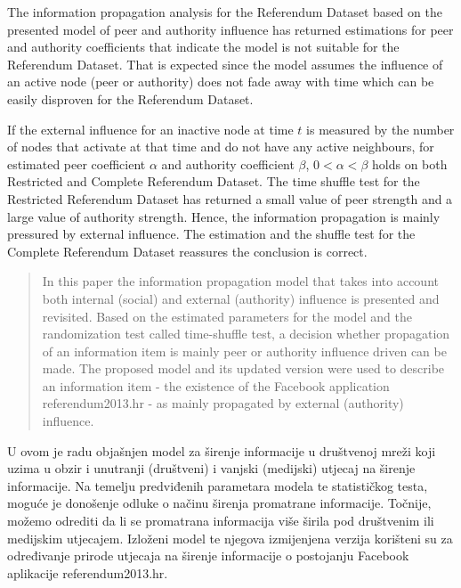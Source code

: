 \documentclass[times, utf8, zavrsni]{fer}
\begin{document}
The information propagation analysis for the Referendum Dataset based on the presented model of peer and authority influence has returned estimations for peer and authority coefficients that indicate the model is not suitable for the Referendum Dataset. That is expected since the model assumes the influence of an active node (peer or authority) does not fade away with time which can be easily disproven for the Referendum Dataset.

If the external influence for an inactive node at time $t$ is measured by the number of nodes that activate at that  time and do not have any active neighbours, for estimated peer coefficient $\alpha$ and authority coefficient $\beta$, $0 < \alpha < \beta$ holds on both Restricted and Complete Referendum Dataset. The time shuffle test for the Restricted Referendum Dataset has returned a small value of peer strength and a large value of authority strength. Hence, the information propagation is mainly pressured by external influence. The estimation and the shuffle test for the Complete Referendum Dataset reassures the conclusion is correct. 



\pagebreak
{}
\begin{abstract}
In this paper the information propagation model that takes into account both internal (social) and external (authority) influence is presented and revisited. Based on the estimated parameters for the model and the randomization test called time-shuffle test, a decision whether propagation of an information item is mainly peer or authority influence driven can be made. The proposed model and its updated version were used to describe an information item - the existence of the Facebook application referendum2013.hr - as mainly propagated by external (authority) influence. 

\end{abstract}
\begin{sazetak}
U ovom je radu objašnjen model za širenje informacije  u društvenoj mreži koji uzima u obzir i unutranji (društveni) i vanjski (medijski) utjecaj na širenje informacije. Na temelju predviđenih parametara modela te statističkog testa, moguće je donošenje odluke o načinu širenja promatrane informacije. Točnije, možemo odrediti da li se promatrana informacija više širila pod društvenim ili medijskim utjecajem. Izloženi model te njegova izmijenjena verzija korišteni su za određivanje prirode utjecaja na širenje informacije o postojanju Facebook aplikacije referendum2013.hr. 

\end{sazetak}
\end{document}
